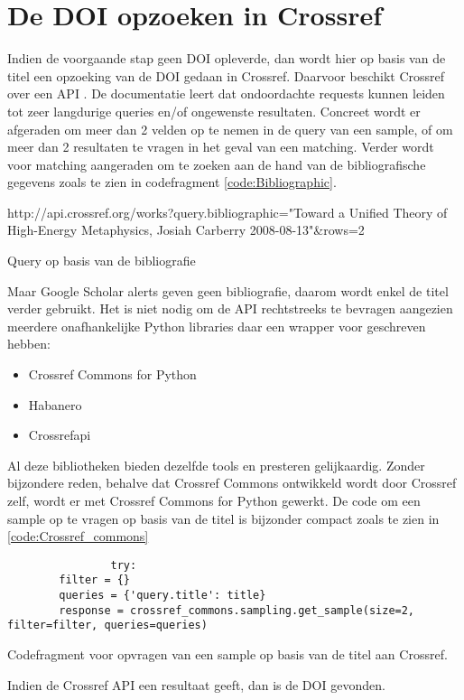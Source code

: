 \section{De DOI opzoeken in Crossref}
Indien de voorgaande stap geen DOI opleverde, dan wordt hier op basis van de titel een opzoeking van de DOI gedaan in Crossref. Daarvoor beschikt Crossref over een API \autocite{Crossrefhowtoapi2025}. De documentatie leert dat ondoordachte requests kunnen leiden tot zeer langdurige queries en/of ongewenste resultaten. Concreet wordt er afgeraden om meer dan 2 velden op te nemen in de query van een sample, of om meer dan 2 resultaten te vragen in het geval van een matching. Verder wordt voor matching aangeraden om te zoeken aan de hand van de bibliografische gegevens zoals te zien in codefragment \ref{code:Bibliographic}.
\begin{listing}
    http://api.crossref.org/works?query.bibliographic="Toward a Unified Theory of High-Energy Metaphysics, Josiah Carberry 2008-08-13"&rows=2
    \caption[Query op basis van de bibliografie]{Query op basis van de bibliografie}
    \label{code:Bibliographic}
\end{listing}
Maar Google Scholar alerts geven geen bibliografie, daarom wordt enkel de titel verder gebruikt.
Het is niet nodig om de API rechtstreeks te bevragen aangezien meerdere onafhankelijke Python libraries daar een wrapper voor geschreven hebben:
\begin{itemize}
    \item Crossref Commons for Python \autocite{Crossrefcommons2025}
    \item Habanero \autocite{Habanero2025}
    \item Crossrefapi \autocite{Crossrefapi2025}
\end{itemize}
Al deze bibliotheken bieden dezelfde tools en presteren gelijkaardig. Zonder bijzondere reden, behalve dat Crossref Commons ontwikkeld wordt door Crossref zelf, wordt er met Crossref Commons for Python gewerkt. De code om een sample op te vragen op basis van de titel is bijzonder compact zoals te zien in \ref{code:Crossref_commons}
\begin{listing}
    \begin{verbatim}
                try:
        filter = {}
        queries = {'query.title': title}
        response = crossref_commons.sampling.get_sample(size=2, filter=filter, queries=queries)
    \end{verbatim}
    \caption[Crossref commons codefragment]{Codefragment voor opvragen van een sample op basis van de titel aan Crossref.}
    \label{code:Crossref_commons}
\end{listing}
Indien de Crossref API een resultaat geeft, dan is de DOI gevonden.
